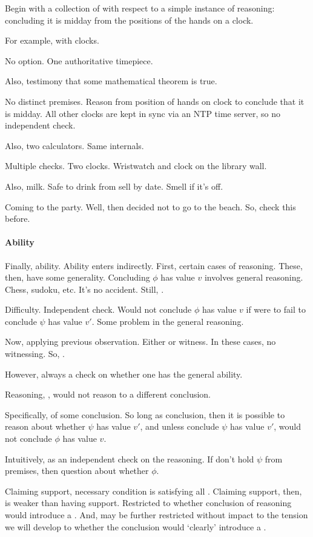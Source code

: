 \begin{note}[\illu{3}]
  Begin with a collection of  with respect to a simple instance of reasoning: concluding it is midday from the positions of the hands on a clock.


  For example, with clocks.

  No option.
  One authoritative timepiece.

  Also, testimony that some mathematical theorem is true.

  No distinct premises.
  Reason from position of hands on clock to conclude that it is midday.
  All other clocks are kept in sync via an NTP time server, so no independent check.

  Also, two calculators.
  Same internals.

  Multiple checks.
  Two clocks.
  Wristwatch and clock on the library wall.

  Also, milk.
  Safe to drink from sell by date.
  Smell if it's off.

  Coming to the party.
  Well, then decided not to go to the beach.
  So, check this before.
\end{note}

\paragraph*{Ability}

\begin{note}
  Finally, ability.
  Ability enters indirectly.
  First, certain cases of reasoning.
  These, then, have some generality.
  Concluding \(\phi\) has value \(v\) involves general reasoning.
  Chess, sudoku, etc.
  It's no accident.
  Still, \csVed{}.

  Difficulty.
  Independent check.
  Would not conclude \(\phi\) has value \(v\) if were to fail to conclude \(\psi\) has value \(v'\).
  Some problem in the general reasoning.

  Now, applying previous observation.
  Either \csVed{} or witness.
  In these cases, no witnessing.
  So, \csVed{}.

  However, always a check on whether one has the general ability.
\end{note}

\begin{note}
  Reasoning, \support{}, would not reason to a different conclusion.

  Specifically, \requ{} of some conclusion.
  So long as conclusion, then it is possible to reason about whether \(\psi\) has value \(v'\), and unless conclude \(\psi\) has value \(v'\), would not conclude \(\phi\) has value \(v\).

  Intuitively, \requ{} as an independent check on the reasoning.
  If don't hold \(\psi\) from premises, then question about whether \(\phi\).

  Claiming support, necessary condition is satisfying all .
  Claiming support, then, is weaker than having support.
  Restricted to whether conclusion of reasoning would introduce a \requ{}.
  And, may be further restricted without impact to the tension we will develop to whether the conclusion would `clearly' introduce a \requ{}.
\end{note}

